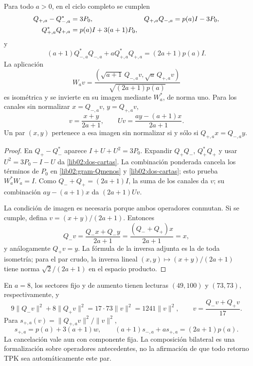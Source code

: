 \begin{theorem}
\label{lib02:balance-bilateral}
Para todo \(a>0\), en el ciclo completo se cumplen
\begin{align}
 Q_{+,a}-Q_{-,a}^*&=3P_0,&
 Q_{+,a}Q_{-,a}&=p(a)I-3P_0,\notag\\
 Q_{+,a}^*Q_{+,a}&=p(a)I+3(a+1)P_0,
 \label{lib02:dos-cartas}
\end{align}
y
\begin{equation}
 (a+1)Q_{-,a}^*Q_{-,a}
 +aQ_{+,a}^*Q_{+,a}=(2a+1)p(a)I.
 \label{lib02:balance-pesado}
\end{equation}
La aplicación
\begin{equation}
 W_av=\frac{(\sqrt{a+1}\,Q_{-,a}v,
                    \sqrt a\,Q_{+,a}v)}{\sqrt{(2a+1)p(a)}}
 \label{lib02:W}
\end{equation}
es isométrica y se invierte en su imagen mediante \(W_a^*\), de
norma uno. Para los canales sin normalizar \(x=Q_{-,a}v\),
\(y=Q_{+,a}v\),
\begin{equation}
 v=\frac{x+y}{2a+1},\qquad
 Uv=\frac{ay-(a+1)x}{2a+1}.
 \label{lib02:reconstruccion-bilateral}
\end{equation}
Un par \((x,y)\) pertenece a esa imagen sin normalizar si y sólo si
\(Q_{+,a}x=Q_{-,a}y\).
\end{theorem}
\begin{proof}
En \(Q_+-Q_-^*\) aparece \(I+U+U^2=3P_0\). Expandir
\(Q_+Q_-\), \(Q_+^*Q_+\) y usar
\(U^2=3P_0-I-U\) da \eqref{lib02:dos-cartas}. La combinación
ponderada cancela los términos de \(P_0\) en
\eqref{lib02:gram-Qmenos} y \eqref{lib02:dos-cartas}; esto prueba
\(W_a^*W_a=I\). Como \(Q_-+Q_+=(2a+1)I\), la suma de los
canales da \(v\); su combinación \(ay-(a+1)x\) da
\((2a+1)Uv\).

La condición de imagen es necesaria porque ambos operadores conmutan.
Si se cumple, defina \(v=(x+y)/(2a+1)\). Entonces
\[
 Q_-v=\frac{Q_-x+Q_-y}{2a+1}
 =\frac{(Q_-+Q_+)x}{2a+1}=x,
\]
y análogamente \(Q_+v=y\). La fórmula de la inversa adjunta es la
de toda isometría; para el par crudo, la inversa lineal
\((x,y)\mapsto(x+y)/(2a+1)\) tiene norma
\(\sqrt2/(2a+1)\) en el espacio producto.
\end{proof}

En \(a=8\), los sectores fijo y de aumento tienen lecturas
\((49,100)\) y \((73,73)\), respectivamente, y
\[
 9\|Q_-v\|^2+8\|Q_+v\|^2=17\cdot73\|v\|^2=1241\|v\|^2,
 \qquad v=\frac{Q_-v+Q_+v}{17}.
\]
Para \(s_{+,a}(v)=\|Q_{+,a}v\|^2/\|v\|^2\),
\[
 s_{+,a}=p(a)+3(a+1)w,
 \qquad (a+1)s_{-,a}+a s_{+,a}=(2a+1)p(a).
\]
La cancelación vale aun con componente fija. La composición bilateral es
una formalización sobre operadores antecedentes, no la afirmación de que
todo retorno TPK sea automáticamente este par.

